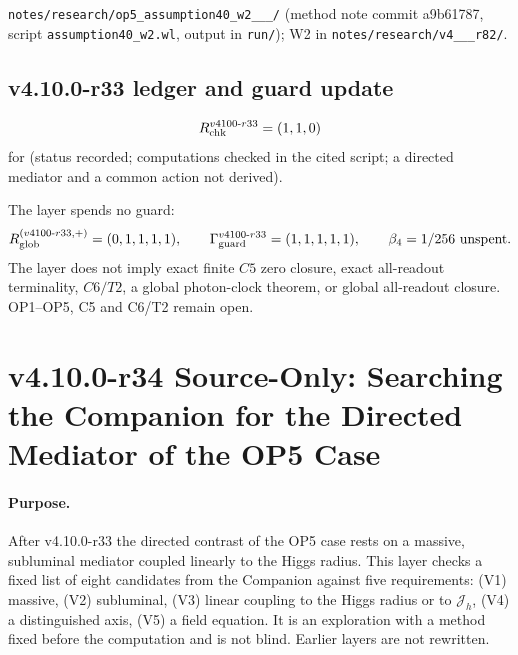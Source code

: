 \texttt{notes/\allowbreak research/\allowbreak op5\_\allowbreak assumption40\_\allowbreak w2\_\_\_/} (method note commit a9b61787,
script \texttt{assumption40\_\allowbreak w2.wl}, output in \texttt{run/}); W2 in \texttt{notes/\allowbreak research/\allowbreak v4\_\_\_\allowbreak r82/}.

\subsection*{v4.10.0-r33 ledger and guard update}
\label{subsec:v4100-r33-ledger-guard}

\[
R_{\rm chk}^{v4100\text{-}r33}=(1,1,0)
\]
for (status recorded; computations checked in the cited script; a directed mediator and a common action not derived).

The layer spends no guard:
\[
R_{\rm glob}^{(v4100\text{-}r33,+)}=(0,1,1,1,1),
\qquad
\Gamma_{\rm guard}^{v4100\text{-}r33}=(1,1,1,1,1),
\qquad
\beta_4=1/256\ \text{unspent}.
\]
The layer does not imply exact finite \(C5\) zero closure, exact all-readout terminality, \(C6/T2\), a global photon-clock theorem,
or global all-readout closure.  OP1--OP5, C5 and C6/T2 remain open.

\clearpage
\section*{v4.10.0-r34 Source-Only: Searching the Companion for the Directed Mediator of the OP5 Case}
\label{sec:v4100-r34-mediator}

\paragraph{Purpose.}
After v4.10.0-r33 the directed contrast of the OP5 case rests on a massive, subluminal mediator coupled linearly to the Higgs radius.  This
layer checks a fixed list of eight candidates from the Companion against five requirements: (V1) massive, (V2) subluminal, (V3) linear
coupling to the Higgs radius or to \(\mathcal J_h\), (V4) a distinguished axis, (V5) a field equation.  It is an exploration with a method
fixed before the computation and is not blind.  Earlier layers are not rewritten.

